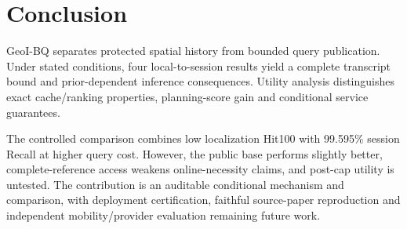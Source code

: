 \section{Conclusion}\label{sec:conclusion}
GeoI-BQ separates protected spatial history from bounded query publication.
Under stated conditions, four local-to-session results yield a complete
transcript bound and prior-dependent inference consequences. Utility analysis
distinguishes exact cache/ranking properties, planning-score gain and conditional
service guarantees.

The controlled comparison combines low localization Hit100 with 99.595\%
session Recall at higher query cost. However, the public base performs slightly
better, complete-reference access weakens online-necessity claims, and post-cap
utility is untested. The contribution is an auditable conditional mechanism and
comparison, with deployment certification, faithful source-paper reproduction
and independent mobility/provider evaluation remaining future work.
